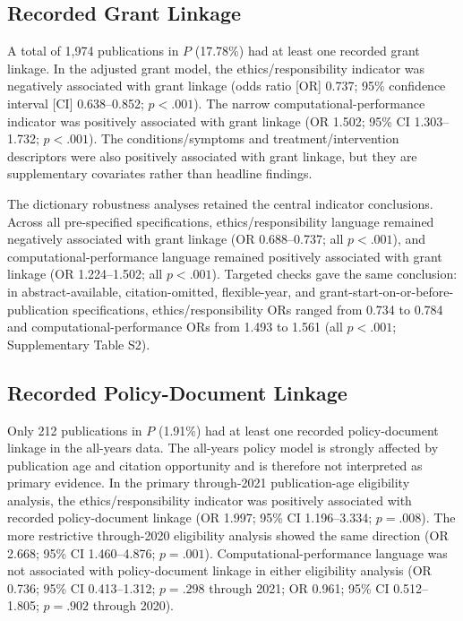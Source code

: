 \documentclass[12pt]{article}
\begin{document}
\subsection{Recorded Grant Linkage}

A total of 1,974 publications in $P$ (17.78\%) had at least one recorded grant linkage. In the adjusted grant model, the ethics/responsibility indicator was negatively associated with grant linkage (odds ratio [OR] 0.737; 95\% confidence interval [CI] 0.638--0.852; $p<.001$). The narrow computational-performance indicator was positively associated with grant linkage (OR 1.502; 95\% CI 1.303--1.732; $p<.001$). The conditions/symptoms and treatment/intervention descriptors were also positively associated with grant linkage, but they are supplementary covariates rather than headline findings.

The dictionary robustness analyses retained the central indicator conclusions. Across all pre-specified specifications, ethics/responsibility language remained negatively associated with grant linkage (OR 0.688--0.737; all $p<.001$), and computational-performance language remained positively associated with grant linkage (OR 1.224--1.502; all $p<.001$). Targeted checks gave the same conclusion: in abstract-available, citation-omitted, flexible-year, and grant-start-on-or-before-publication specifications, ethics/responsibility ORs ranged from 0.734 to 0.784 and computational-performance ORs from 1.493 to 1.561 (all $p<.001$; Supplementary Table S2).

\subsection{Recorded Policy-Document Linkage}

Only 212 publications in $P$ (1.91\%) had at least one recorded policy-document linkage in the all-years data. The all-years policy model is strongly affected by publication age and citation opportunity and is therefore not interpreted as primary evidence. In the primary through-2021 publication-age eligibility analysis, the ethics/responsibility indicator was positively associated with recorded policy-document linkage (OR 1.997; 95\% CI 1.196--3.334; $p=.008$). The more restrictive through-2020 eligibility analysis showed the same direction (OR 2.668; 95\% CI 1.460--4.876; $p=.001$). Computational-performance language was not associated with policy-document linkage in either eligibility analysis (OR 0.736; 95\% CI 0.413--1.312; $p=.298$ through 2021; OR 0.961; 95\% CI 0.512--1.805; $p=.902$ through 2020).
\end{document}
